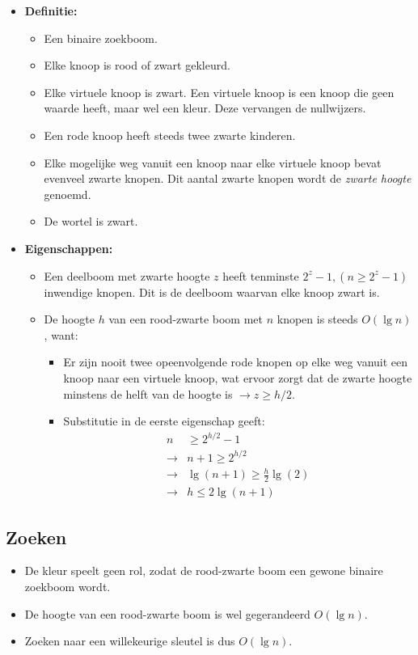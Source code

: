 \begin{itemize}
    \item \textbf{Definitie:}
    \begin{itemize}
        \item Een binaire zoekboom.
        \item Elke knoop is rood of zwart gekleurd.
        \item Elke virtuele knoop is zwart. Een virtuele knoop is een knoop die geen waarde heeft, maar wel een kleur. Deze vervangen de nullwijzers.
        \item Een rode knoop heeft steeds twee zwarte kinderen.
        \item Elke mogelijke weg vanuit een knoop naar elke virtuele knoop bevat evenveel zwarte knopen. Dit aantal zwarte knopen wordt de \textit{zwarte hoogte} genoemd.
        \item De wortel is zwart.
    \end{itemize}
    \item \textbf{Eigenschappen:}
    \begin{itemize}
        \item Een deelboom met zwarte hoogte $z$ heeft tenminste $2^z - 1, (n \geq 2^z - 1)$ inwendige knopen. Dit is de deelboom waarvan elke knoop zwart is.
        \item De hoogte $h$ van een rood-zwarte boom met $n$ knopen is steeds $O(\lg n)$, want:
        \begin{itemize}
            \item Er zijn nooit twee opeenvolgende rode knopen op elke weg vanuit een knoop naar een virtuele knoop, wat ervoor zorgt dat de zwarte hoogte minstens de helft van de hoogte is $\rightarrow z \geq h/2$.
            \item Substitutie in de eerste eigenschap geeft:
            \begin{align*}
                n & \geq 2^{h/2} - 1 \\
                \rightarrow & n + 1  \geq 2^{h/2} \\
                \rightarrow & \lg(n + 1) \geq \frac{h}{2}\lg(2) \\
                \rightarrow & h  \leq 2\lg(n + 1)
            \end{align*}
        \end{itemize}
    \end{itemize}

\end{itemize}
\subsection{Zoeken}
\begin{itemize}
    \item De kleur speelt geen rol, zodat de rood-zwarte boom een gewone binaire zoekboom wordt.
    \item De hoogte van een rood-zwarte boom is wel gegerandeerd $O(\lg n)$.
    \item Zoeken naar een willekeurige sleutel is dus $O(\lg n)$.
\end{itemize}

